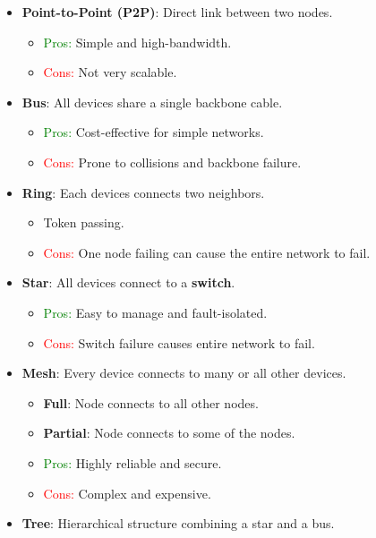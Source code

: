 \documentclass[12pt, letterpaper]{article}
\begin{document}
\begin{itemize}
    \item \textbf{Point-to-Point (P2P)}: Direct link between two nodes.
        \begin{itemize}
            \item \textcolor{green}{Pros:} Simple and high-bandwidth.
            \item \textcolor{red}{Cons:} Not very scalable.
        \end{itemize}
    \item \textbf{Bus}: All devices share a single backbone cable.
        \begin{itemize}
            \item \textcolor{green}{Pros:} Cost-effective for simple networks.
            \item \textcolor{red}{Cons:} Prone to collisions and backbone failure.
        \end{itemize}
    \item \textbf{Ring}: Each devices connects two neighbors.
        \begin{itemize}
            \item Token passing.
            \item \textcolor{red}{Cons:} One node failing can cause the entire network to fail.
        \end{itemize}
    \item \textbf{Star}: All devices connect to a \textbf{switch}.
        \begin{itemize}
            \item \textcolor{green}{Pros:} Easy to manage and fault-isolated.
            \item \textcolor{red}{Cons:} Switch failure causes entire network to fail.
        \end{itemize}
    \item \textbf{Mesh}: Every device connects to many or all other devices.
        \begin{itemize}
            \item \textbf{Full}: Node connects to all other nodes.
            \item \textbf{Partial}: Node connects to some of the nodes.
            \item \textcolor{green}{Pros:} Highly reliable and secure.
            \item \textcolor{red}{Cons:} Complex and expensive.
        \end{itemize}
    \item \textbf{Tree}: Hierarchical structure combining a star and a bus.

\end{itemize}
\end{document}

